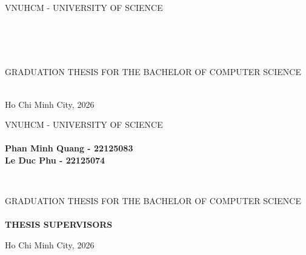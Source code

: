 \begin{titlepage}

\begin{center}
VNUHCM - UNIVERSITY OF SCIENCE\\
\textbf{\faculty}\\[2cm]


{ \Large \bfseries \authorNames\\[2cm] }

{ \Large \bfseries \MakeUppercase{\thesisTitle} \\[3cm]}

\large GRADUATION THESIS FOR THE BACHELOR OF COMPUTER SCIENCE\\
\large \program\\[2cm]



\vfill
Ho Chi Minh City, 2026

\end{center}

\pagebreak



\begin{center}

VNUHCM - UNIVERSITY OF SCIENCE\\
\textbf{\faculty}\\[2cm]


{\large \bfseries Phan Minh Quang - 22125083\\}
{\large \bfseries Le Duc Phu - 22125074\\[2cm]}

{ \Large \bfseries \MakeUppercase{\thesisTitle} \\[2cm] }

\large GRADUATION THESIS FOR THE BACHELOR OF COMPUTER SCIENCE\\
\large \program\\[2cm]

\textbf{THESIS SUPERVISORS}\\
\advisorNames


\vfill
Ho Chi Minh City, 2026

\end{center}
\end{titlepage}
